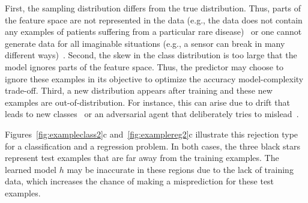 
 First, the sampling distribution differs from the true distribution. Thus, parts of the feature space are not represented in the data (e.g., the data does not contain any examples of patients suffering from a particular rare disease)~\citep{VanderPlas2021} or one cannot generate data for all imaginable situations (e.g., a sensor can break in many different ways)~\citep{Hendrickx2022,Urahama1995,Hsu2020}. Second, the skew in the class distribution is too large that the model ignores parts of the feature space. Thus, the predictor may choose to ignore these examples in its objective to optimize the accuracy model-complexity trade-off. Third, a new distribution appears after training and these new examples are out-of-distribution. For instance, this can arise due to drift that leads to new classes~\citep{Landgrebe2004} or an adversarial agent that deliberately tries to mislead~\citep{Wang2020,Corbiere2022}.

Figures~\ref{fig:exampleclass2}c and~\ref{fig:examplereg2}c illustrate this rejection type for a classification and a regression problem. In both cases, the three black stars represent test examples that are far away from the training examples. 
The learned model $h$ may be inaccurate in these regions due to the lack of training data, which increases the chance of making a misprediction for these test examples.


